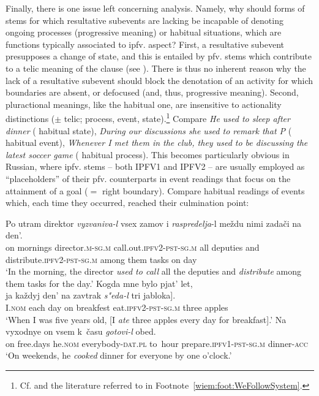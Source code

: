 \documentclass[output=paper]{langscibook}
\begin{document}
Finally, there is one issue left concerning  analysis. Namely, why should forms of stems for which resultative subevents are lacking be incapable of denoting ongoing processes (progressive meaning) or habitual situations, which are functions typically associated to ipfv. aspect? First, a resultative subevent presupposes a change of state, and this is entailed by pfv. stems which contribute to a telic meaning of the clause (see %
). There is thus no inherent reason why the lack of a resultative subevent should block the denotation of an activity for which boundaries are absent, or defocused (and, thus, progressive meaning). Second, pluractional meanings, like the habitual one, are insensitive to actionality distinctions ($\pm$ telic; process, event, state).\footnote{Cf. \citet[118]{Tatevosov2016} and the literature referred to in Footnote~\ref{wiem:foot:WeFollowSystem}.} Compare \textit{He used to sleep after dinner} ({\rightarrow} habitual state), \textit{During our discussions she used to remark that P} ({\rightarrow} habitual event), \textit{Whenever I met them in the club, they used to be discussing the latest soccer game} ({\rightarrow} habitual process). This becomes particularly obvious in Russian, where ipfv. stems -- both IPFV1 and IPFV2 -- are usually employed as “placeholders” of their pfv. counterparts in event readings that focus on the attainment of a goal ($=$ right boundary). Compare habitual readings of events which, each time they occurred, reached their culmination point:

\ea\label{wiem:ex:direktor}{\gll
{Po} {utram} {direktor} {\textit{vyzvaniva-l}} {vsex} {zamov} {i} {\textit{raspredelja}-l} {meždu} {nimi} {zadači} {na} {den}’.\\
on mornings director.\textsc{m-sg.m} call.out.\textsc{ipfv2-pst-sg.m} all deputies and distribute.\textsc{ipfv2-pst-sg.m} among them tasks on day\\
\glt ‘In the morning, the director \textit{used to call} all the deputies and \textit{distribute} among them tasks for the day.’
}
\ex\label{wiem:ex:jabloki}{
{Kogda} {mne} {bylo} {pjat’} {let},\\
\gll \minsp{[} {ja} {každyj} {den’} {na} {zavtrak} \textit{{s"eda-l}} {tri} {jabloka}].\\
{} \textsc{I.nom} each day on breakfest eat.\textsc{ipfv2-pst-sg.m} three apples\\
\glt‘When I was five years old, [I \textit{ate} three apples every day for breakfast].’
}
\ex\label{wiem:ex:obed}{\gll
{Na} {vyxodnye} {on} {vsem} {k~času} \textit{{gotovi-l}} {obed}.\\
on free.days he.\textsc{nom} everybody-\textsc{dat.pl} to~hour prepare.\textsc{ipfv1-pst-sg.m} dinner-\textsc{acc}\\
\glt ‘On weekends, he \textit{cooked} dinner for everyone by one o’clock.’
}
\z
\end{document}
